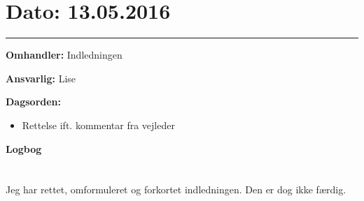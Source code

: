 \section{Dato: 13.05.2016}
\hrule

\textbf{Omhandler:} Indledningen

\textbf{Ansvarlig:} Lise

\textbf{Dagsorden:}
\begin{itemize}
	\item Rettelse ift. kommentar fra vejleder 	
\end{itemize}

\textbf{Logbog}
\\
\\ \\

Jeg har rettet, omformuleret og forkortet indledningen. Den er dog ikke færdig.  



